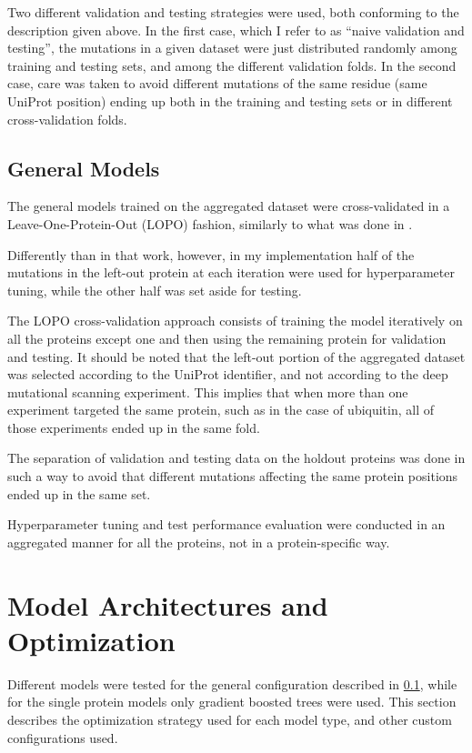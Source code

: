 Two different validation and testing strategies were used, both conforming to the description given above.
In the first case, which I refer to as ``naive validation and testing'', the mutations in a given dataset were just distributed randomly among training and testing sets, and among the different validation folds.
In the second case, care was taken to avoid different mutations of the same residue (same UniProt position) ending up both in the training and testing sets or in different cross-validation folds.

\subsection{General Models}\label{sec:mm_general_models}
The general models trained on the aggregated dataset were cross-validated in a Leave-One-Protein-Out (LOPO) fashion, similarly to what was done in \textcite{Gray2018}.

Differently than in that work, however, in my implementation half of the mutations in the left-out protein at each iteration were used for hyperparameter tuning, while the other half was set aside for testing.

The LOPO cross-validation approach consists of training the model iteratively on all the proteins except one and then using the remaining protein for validation and testing.
It should be noted that the left-out portion of the aggregated dataset was selected according to the UniProt identifier, and not according to the deep mutational scanning experiment.
This implies that when more than one experiment targeted the same protein, such as in the case of ubiquitin, all of those experiments ended up in the same fold.

The separation of validation and testing data on the holdout proteins was done in such a way to avoid that different mutations affecting the same protein positions ended up in the same set.

Hyperparameter tuning and test performance evaluation were conducted in an aggregated manner for all the proteins, not in a protein-specific way.

\section{Model Architectures and Optimization}\label{sec:mm_optimization}
Different models were tested for the general configuration described in \cref{sec:mm_general_models}, while for the single protein models only gradient boosted trees were used.
This section describes the optimization strategy used for each model type, and other custom configurations used.

